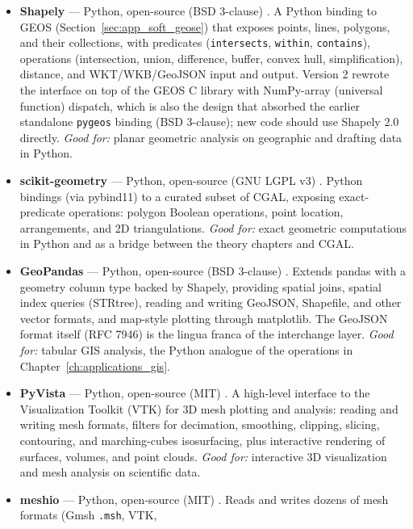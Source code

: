 \begin{itemize}
  \item \textbf{Shapely} --- Python, open-source (BSD 3-clause)
    \cite{gillies2007}. A Python binding to GEOS
    (Section~\ref{sec:app_soft_geose}) that exposes points, lines,
    polygons, and their collections, with predicates
    (\texttt{intersects}, \texttt{within}, \texttt{contains}),
    operations (intersection, union, difference, buffer, convex hull,
    simplification), distance, and WKT/WKB/GeoJSON input and output.
    Version 2 rewrote the interface on top of the GEOS C library with
    NumPy-array (universal function) dispatch, which is also the design
    that absorbed the earlier standalone \texttt{pygeos} binding
    (BSD 3-clause); new code should use Shapely 2.0 directly.
    \emph{Good for:} planar geometric analysis on geographic and
    drafting data in Python.
  \item \textbf{scikit-geometry} --- Python, open-source (GNU LGPL v3)
    \cite{scikitgeometry}. Python bindings (via pybind11) to a curated
    subset of CGAL, exposing exact-predicate operations: polygon
    Boolean operations, point location, arrangements, and 2D
    triangulations. \emph{Good for:} exact geometric computations in
    Python and as a bridge between the theory chapters and CGAL.
  \item \textbf{GeoPandas} --- Python, open-source (BSD 3-clause)
    \cite{geopandas}. Extends pandas with a geometry column type backed
    by Shapely, providing spatial joins, spatial index queries (STRtree),
    reading and writing GeoJSON, Shapefile, and other vector formats,
    and map-style plotting through matplotlib. The GeoJSON format itself
    (RFC 7946) is the lingua franca of the interchange layer.
    \emph{Good for:} tabular GIS analysis, the Python analogue of the
    operations in Chapter~\ref{ch:applications_gis}.
  \item \textbf{PyVista} --- Python, open-source (MIT) \cite{pyvista}.
    A high-level interface to the Visualization Toolkit (VTK)
    \cite{vtk} for 3D mesh plotting and analysis: reading and writing
    mesh formats, filters for decimation, smoothing, clipping,
    slicing, contouring, and marching-cubes isosurfacing, plus
    interactive rendering of surfaces, volumes, and point clouds.
    \emph{Good for:} interactive 3D visualization and mesh analysis on
    scientific data.
  \item \textbf{meshio} --- Python, open-source (MIT) \cite{meshio}.
    Reads and writes dozens of mesh formats (Gmsh \texttt{.msh}, VTK,

\end{itemize}
